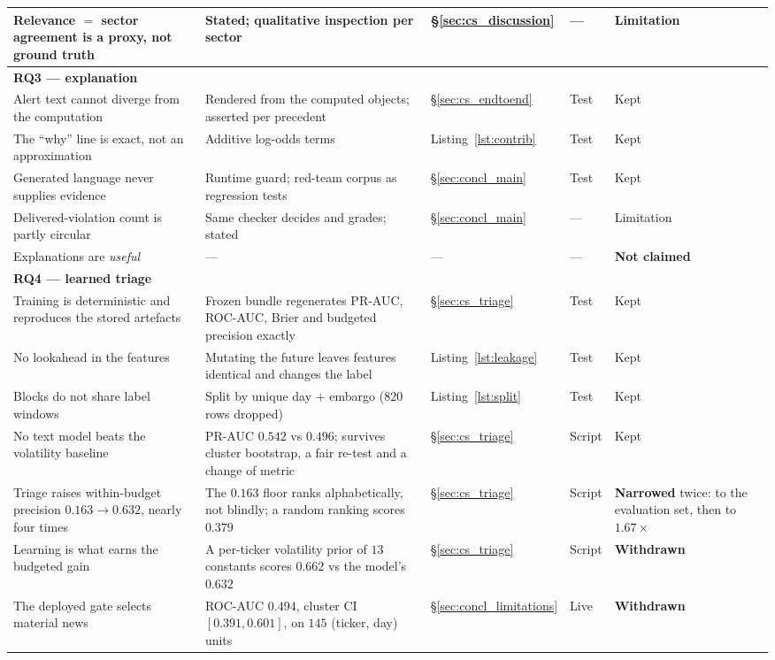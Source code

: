 \begin{table}[ht]
\begin{tabular}{p{4.6cm} p{3.5cm} p{1.6cm} p{1.2cm} p{1.7cm}}
Relevance $=$ sector agreement is a proxy, not ground truth & Stated; qualitative inspection per sector & §\ref{sec:cs_discussion} & --- & Limitation \\
\midrule
\multicolumn{5}{l}{\textbf{RQ3 — explanation}} \\
Alert text cannot diverge from the computation & Rendered from the computed objects; asserted per precedent & §\ref{sec:cs_endtoend} & Test & Kept \\
The ``why'' line is exact, not an approximation & Additive log-odds terms & Listing~\ref{lst:contrib} & Test & Kept \\
Generated language never supplies evidence & Runtime guard; red-team corpus as regression tests & §\ref{sec:concl_main} & Test & Kept \\
Delivered-violation count is partly circular & Same checker decides and grades; stated & §\ref{sec:concl_main} & --- & Limitation \\
Explanations are \emph{useful} & --- & --- & --- & \textbf{Not claimed} \\
\midrule
\multicolumn{5}{l}{\textbf{RQ4 — learned triage}} \\
Training is deterministic and reproduces the stored artefacts & Frozen bundle regenerates PR-AUC, ROC-AUC, Brier and budgeted precision exactly & §\ref{sec:cs_triage} & Test & Kept \\
No lookahead in the features & Mutating the future leaves features identical and changes the label & Listing~\ref{lst:leakage} & Test & Kept \\
Blocks do not share label windows & Split by unique day $+$ embargo ($820$ rows dropped) & Listing~\ref{lst:split} & Test & Kept \\
No text model beats the volatility baseline & PR-AUC $0.542$ vs $0.496$; survives cluster bootstrap, a fair re-test and a change of metric & §\ref{sec:cs_triage} & Script & Kept \\
Triage raises within-budget precision $0.163 \to 0.632$, nearly four times & The $0.163$ floor ranks alphabetically, not blindly; a random ranking scores $0.379$ & §\ref{sec:cs_triage} & Script & \textbf{Narrowed} twice: to the evaluation set, then to $1.67\times$ \\
Learning is what earns the budgeted gain & A per-ticker volatility prior of $13$ constants scores $0.662$ vs the model's $0.632$ & §\ref{sec:cs_triage} & Script & \textbf{Withdrawn} \\
The deployed gate selects material news & ROC-AUC $0.494$, cluster CI $[0.391, 0.601]$, on $145$ (ticker, day) units & §\ref{sec:concl_limitations} & Live & \textbf{Withdrawn} \\

\end{tabular}
\end{table}
